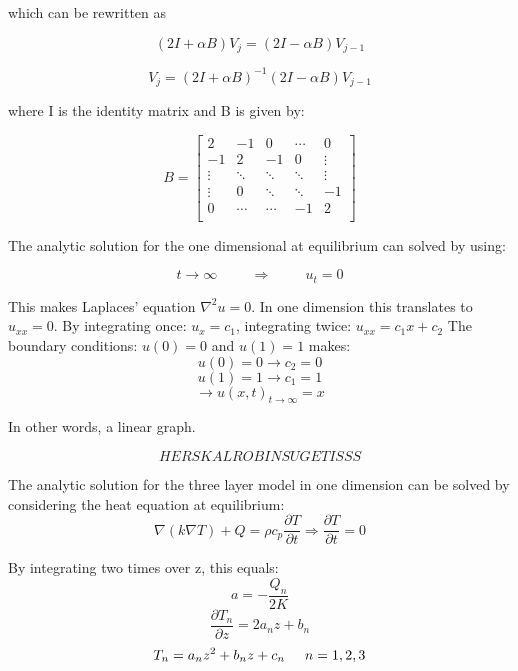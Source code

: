 \documentclass[10pt,a4paper]{article}
\begin{document}
\noindent which can be rewritten as

\begin{equation}
(2I + \alpha B)V_j = (2I - \alpha B)V_{j-1}
\end{equation}

\begin{equation}
V_j = (2I + \alpha B)^{-1}(2I - \alpha B)V_{j-1}
\end{equation}

\noindent where I is the identity matrix and B is given by:

\begin{equation}
B = \begin{bmatrix}
2 & -1 & 0 & \cdots &0\\
-1 & 2 & -1 & 0 & \vdots\\
\vdots & \ddots & \ddots & \ddots & \vdots\\
\vdots & 0 & \ddots & \ddots & -1\\
0 & \cdots & \cdots & -1 & 2\\
\end{bmatrix}
\end{equation}


\noindent The analytic solution for the one dimensional at equilibrium can solved by using:

 
$$t\rightarrow\infty \hspace{1cm} \Rightarrow \hspace{1cm}u_t=0$$


\noindent This makes Laplaces' equation $\nabla^2u=0$. In one dimension this translates to$u_{xx}=0$. By integrating once: $u_x=c_1$, integrating twice: $u_{xx}=c_1x+c_2$
The boundary conditions: $u(0)=0$ and $u(1)=1$ makes:
$$u(0)=0\rightarrow c_2=0$$
$$u(1)=1 \rightarrow c_1=1$$
$$\rightarrow u(x,t)_{t\rightarrow\infty}=x$$ 

\noindent In other words, a linear graph.

$$HERSKALROBINSUGETISSS$$


\noindent The analytic solution for the three layer model in one dimension can be solved by considering the heat equation at equilibrium:\\

\begin{equation}
\nabla(k\nabla T) +Q=\rho c_p \frac{\partial T}{\partial t} \Rightarrow \frac{\partial T}{\partial t}=0
\end{equation}

\noindent By integrating two times over z, this equals:
\begin{equation}
a=-\frac{Q_n}{2K}
\end{equation}
\begin{equation}
\frac{\partial T_n}{\partial z}=2a_nz+b_n
\end{equation}
\begin{equation}
T_n=a_nz^2+b_nz+c_n \hspace{0.5cm} n= 1,2,3
\end{equation}
\end{document}
